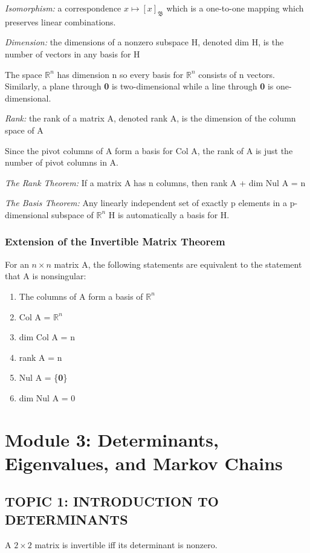 \documentclass[12pt]{article} %
\newcommand{\R}{\mathbb{R}}
\begin{document}
\emph{Isomorphism:} a correspondence $x \mapsto [x]_\mathfrak{B}$ which is a one-to-one mapping which preserves linear combinations.

\emph{Dimension:} the dimensions of a nonzero subspace H, denoted dim H, is the number of vectors in any basis for H

The space $\R^n$ has dimension n so every basis for $\R^n$ consists of n vectors. Similarly, a plane through \textbf{0} is two-dimensional while a line through \textbf{0} is one-dimensional. 

\emph{Rank:} the rank of a matrix A, denoted rank A, is the dimension of the column space of A

Since the pivot columns of A form a basis for Col A, the rank of A is just the number of pivot columns in A.

\emph{The Rank Theorem:} If a matrix A has n columns, then rank A + dim Nul A = n

\emph{The Basis Theorem:} Any linearly independent set of exactly p elements in a p-dimensional subspace of $\R^n$ H is automatically a basis for H.

\subsubsection{Extension of the Invertible Matrix Theorem}
For an $n \times n$ matrix A, the following statements are equivalent to the statement that A is nonsingular:
\begin{enumerate}
	\item The columns of A form a basis of $\R^n$
	\item Col A = $\R^n$
	\item dim Col A = n
	\item rank A = n
	\item Nul A = \{\textbf{0}\}
	\item dim Nul A = 0
\end{enumerate}

\pagebreak

\section{Module 3: Determinants, Eigenvalues, and Markov Chains}
\subsection{TOPIC 1: INTRODUCTION TO DETERMINANTS}
A $2 \times 2$ matrix is invertible iff its determinant is nonzero.
\end{document}
